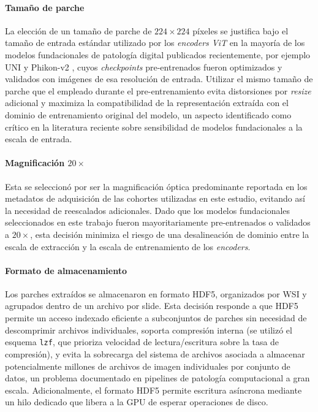 \paragraph{Tamaño de parche} La elección de un tamaño de parche de $224\times224$ píxeles se justifica bajo el tamaño de entrada estándar utilizado por los \textit{encoders ViT} en la mayoría de los modelos fundacionales de patología digital publicados recientemente, por ejemplo UNI \parencite{chen2024uni} y Phikon-v2 \parencite{filiot2024phikonv2}, cuyos \textit{checkpoints} pre-entrenados fueron optimizados y validados con imágenes de esa resolución de entrada. Utilizar el mismo tamaño de parche que el empleado durante el pre-entrenamiento evita distorsiones por \textit{resize} adicional y maximiza la compatibilidad de la representación extraída con el dominio de entrenamiento original del modelo, un aspecto identificado como crítico en la literatura reciente sobre sensibilidad de modelos fundacionales a la escala de entrada.

\paragraph{Magnificación \textbf{$20\times$}} Esta se seleccionó por ser la magnificación óptica predominante reportada en los metadatos de adquisición de las cohortes utilizadas en este estudio, evitando así la necesidad de reescalados adicionales. Dado que los modelos fundacionales seleccionados en este trabajo fueron mayoritariamente pre-entrenados o validados a $20\times$, esta decisión minimiza el riesgo de una desalineación de dominio entre la escala de extracción y la escala de entrenamiento de los \textit{encoders}.

\paragraph{Formato de almacenamiento} Los parches extraídos se almacenaron en formato HDF5, organizados por WSI y agrupados dentro de un archivo por slide. Esta decisión responde a que HDF5 permite un acceso indexado eficiente a subconjuntos de parches sin necesidad de descomprimir archivos individuales, soporta compresión interna (se utilizó el esquema \texttt{lzf}, que prioriza velocidad de lectura/escritura sobre la tasa de compresión), y evita la sobrecarga del sistema de archivos asociada a almacenar potencialmente millones de archivos de imagen individuales por conjunto de datos, un problema documentado en pipelines de patología computacional a gran escala. Adicionalmente, el formato HDF5 permite escritura asíncrona mediante un hilo dedicado que libera a la GPU de esperar operaciones de disco.


